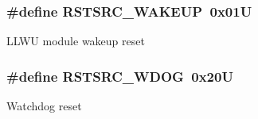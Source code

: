 \subsubsection[{R\+S\+T\+S\+R\+C\+\_\+\+W\+A\+K\+E\+U\+P}]{\setlength{\rightskip}{0pt plus 5cm}\#define R\+S\+T\+S\+R\+C\+\_\+\+W\+A\+K\+E\+U\+P~0x01\+U}\label{group___p_e___const__module_gaeed5dacbb9d0e07213c8840434f6cd6a}
L\+L\+W\+U module wakeup reset \hypertarget{group___p_e___const__module_ga789b8aee910293e98e3d259ced79864c}{}
\subsubsection[{R\+S\+T\+S\+R\+C\+\_\+\+W\+D\+O\+G}]{\setlength{\rightskip}{0pt plus 5cm}\#define R\+S\+T\+S\+R\+C\+\_\+\+W\+D\+O\+G~0x20\+U}\label{group___p_e___const__module_ga789b8aee910293e98e3d259ced79864c}
Watchdog reset 